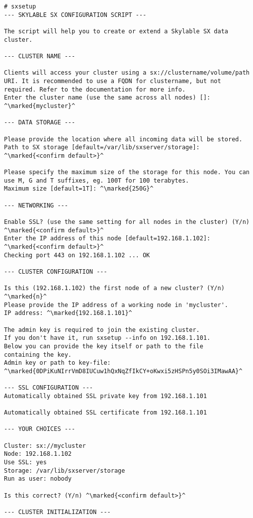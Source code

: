 \begin{lstlisting}
# sxsetup
--- SKYLABLE SX CONFIGURATION SCRIPT ---

The script will help you to create or extend a Skylable SX data
cluster.

--- CLUSTER NAME ---

Clients will access your cluster using a sx://clustername/volume/path
URI. It is recommended to use a FQDN for clustername, but not
required. Refer to the documentation for more info.
Enter the cluster name (use the same across all nodes) []: ^\marked{mycluster}^

--- DATA STORAGE ---

Please provide the location where all incoming data will be stored.
Path to SX storage [default=/var/lib/sxserver/storage]: ^\marked{<confirm default>}^

Please specify the maximum size of the storage for this node. You can
use M, G and T suffixes, eg. 100T for 100 terabytes.
Maximum size [default=1T]: ^\marked{250G}^

--- NETWORKING ---

Enable SSL? (use the same setting for all nodes in the cluster) (Y/n)
^\marked{<confirm default>}^
Enter the IP address of this node [default=192.168.1.102]: ^\marked{<confirm default>}^
Checking port 443 on 192.168.1.102 ... OK

--- CLUSTER CONFIGURATION ---

Is this (192.168.1.102) the first node of a new cluster? (Y/n) ^\marked{n}^
Please provide the IP address of a working node in 'mycluster'.
IP address: ^\marked{192.168.1.101}^

The admin key is required to join the existing cluster.
If you don't have it, run sxsetup --info on 192.168.1.101.
Below you can provide the key itself or path to the file
containing the key.
Admin key or path to key-file:
^\marked{0DPiKuNIrrVmD8IUCuw1hQxNqZfIkCY+oKwxi5zHSPn5y0SOi3IMawAA}^

--- SSL CONFIGURATION ---
Automatically obtained SSL private key from 192.168.1.101

Automatically obtained SSL certificate from 192.168.1.101

--- YOUR CHOICES ---

Cluster: sx://mycluster
Node: 192.168.1.102
Use SSL: yes
Storage: /var/lib/sxserver/storage
Run as user: nobody

Is this correct? (Y/n) ^\marked{<confirm default>}^

--- CLUSTER INITIALIZATION ---


\end{lstlisting}
